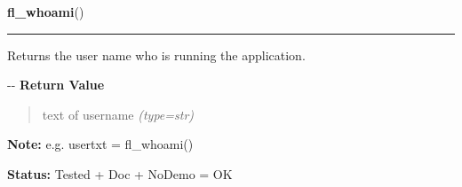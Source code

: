     \label{xformslib:flbasic:fl_whoami}

    \vspace{0.5ex}

\hspace{.8\funcindent}\begin{boxedminipage}{\funcwidth}

    \raggedright \textbf{fl\_whoami}()

    \vspace{-1.5ex}

    \rule{\textwidth}{0.5\fboxrule}
\setlength{\parskip}{2ex}

Returns the user name who is running the application.

-{}-
\setlength{\parskip}{1ex}
      \textbf{Return Value}
    \vspace{-1ex}

      \begin{quote}

text of username
      {\it (type=str)}

      \end{quote}

\textbf{Note:} 
e.g. usertxt = fl\_whoami()


\textbf{Status:} 
Tested + Doc + NoDemo = OK


    \end{boxedminipage}

    \label{xformslib:flbasic:fl_mouse_button}

    \vspace{0.5ex}

